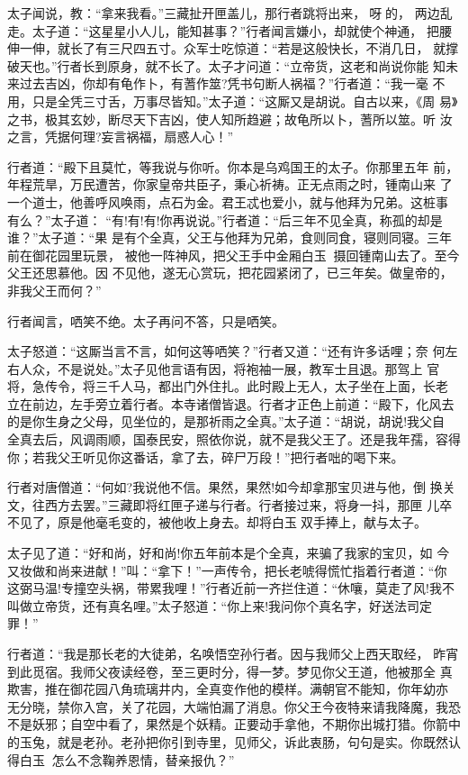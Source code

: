 太子闻说，教：“拿来我看。”三藏扯开匣盖儿，那行者跳将出来，呀的，
两边乱走。太子道：“这星星小人儿，能知甚事？”行者闻言嫌小，却就使个神通，
把腰伸一伸，就长了有三尺四五寸。众军士吃惊道：“若是这般快长，不消几日，
就撑破天也。”行者长到原身，就不长了。太子才问道：“立帝货，这老和尚说你能
知未来过去吉凶，你却有龟作卜，有蓍作筮?凭书句断人祸福？”行者道：“我一毫
不用，只是全凭三寸舌，万事尽皆知。”太子道：“这厮又是胡说。自古以来，《周
易》之书，极其玄妙，断尽天下吉凶，使人知所趋避；故龟所以卜，蓍所以筮。听
汝之言，凭据何理?妄言祸福，扇惑人心！”

行者道：“殿下且莫忙，等我说与你听。你本是乌鸡国王的太子。你那里五年
前，年程荒旱，万民遭苦，你家皇帝共臣子，秉心祈祷。正无点雨之时，锺南山来
了一个道士，他善呼风唤雨，点石为金。君王忒也爱小，就与他拜为兄弟。这桩事
有么？”太子道：
“有!有!有!你再说说。”行者道：“后三年不见全真，称孤的却是谁？”太子道：“果
是有个全真，父王与他拜为兄弟，食则同食，寝则同寝。三年前在御花园里玩景，
被他一阵神风，把父王手中金厢白玉，摄回锺南山去了。至今父王还思慕他。因
不见他，遂无心赏玩，把花园紧闭了，已三年矣。做皇帝的，非我父王而何？”

行者闻言，哂笑不绝。太子再问不答，只是哂笑。

太子怒道：“这厮当言不言，如何这等哂笑？”行者又道：“还有许多话哩；奈
何左右人众，不是说处。”太子见他言语有因，将袍袖一展，教军士且退。那驾上
官将，急传令，将三千人马，都出门外住扎。此时殿上无人，太子坐在上面，长老
立在前边，左手旁立着行者。本寺诸僧皆退。行者才正色上前道：“殿下，化风去
的是你生身之父母，见坐位的，是那祈雨之全真。”太子道：“胡说，胡说!我父自
全真去后，风调雨顺，国泰民安，照依你说，就不是我父王了。还是我年孺，容得
你；若我父王听见你这番话，拿了去，碎尸万段！”把行者咄的喝下来。

行者对唐僧道：“何如?我说他不信。果然，果然!如今却拿那宝贝进与他，倒
换关文，往西方去罢。”三藏即将红匣子递与行者。行者接过来，将身一抖，那匣
儿卒不见了，原是他毫毛变的，被他收上身去。却将白玉双手捧上，献与太子。

太子见了道：“好和尚，好和尚!你五年前本是个全真，来骗了我家的宝贝，如
今又妆做和尚来进献！”叫：“拿下！”一声传令，把长老唬得慌忙指着行者道：“你
这弼马温!专撞空头祸，带累我哩！”行者近前一齐拦住道：“休嚷，莫走了风!我不
叫做立帝货，还有真名哩。”太子怒道：“你上来!我问你个真名字，好送法司定罪！”

行者道：“我是那长老的大徒弟，名唤悟空孙行者。因与我师父上西天取经，
昨宵到此觅宿。我师父夜读经卷，至三更时分，得一梦。梦见你父王道，他被那全
真欺害，推在御花园八角琉璃井内，全真变作他的模样。满朝官不能知，你年幼亦
无分晓，禁你入宫，关了花园，大端怕漏了消息。你父王今夜特来请我降魔，我恐
不是妖邪；自空中看了，果然是个妖精。正要动手拿他，不期你出城打猎。你箭中
的玉兔，就是老孙。老孙把你引到寺里，见师父，诉此衷肠，句句是实。你既然认
得白玉，怎么不念鞠养恩情，替亲报仇？”

